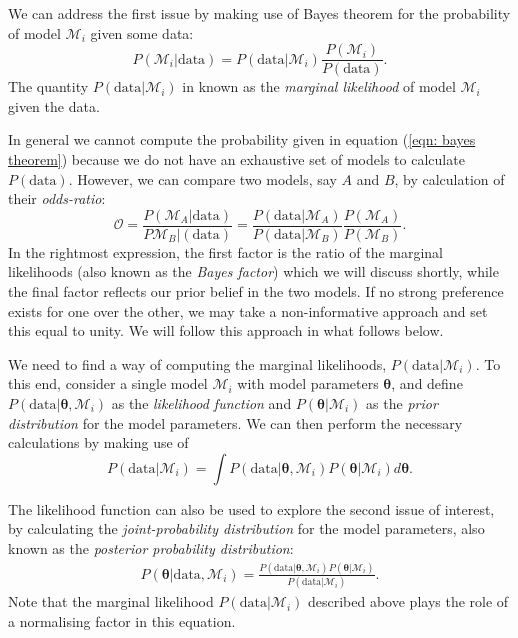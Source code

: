 \documentclass[../full_thesis/full_thesis.tex]{subfiles}
\newcommand{\M}{\mathcal{M}}
\newcommand{\data}{\textrm{data}}
\newcommand{\params}{\boldsymbol{\theta}}
\begin{document}
We can address the first issue by making use of Bayes theorem for the
probability of model $\M_{i}$ given some data:
\begin{equation}
    P(\M_{i} | \data) = P(\data | \M_{i}) \frac{P(\M_{i})}{P(\data)}.
\label{eqn: bayes theorem}
\end{equation}
The quantity $P(\data | \M_{i})$ in known as the \emph{marginal likelihood} of
model $\M_i$ given the data.

In general we cannot compute the probability given in equation (\ref{eqn: bayes
theorem})  because we do not have an exhaustive set of models to calculate
$P(\data)$.  However, we can compare two models, say $A$ and $B$, by
calculation of their \emph{odds-ratio}:
\begin{equation}
\mathcal{O} = \frac{P(\M_{A}|\data)}{P\M_{B}|(\data)}=
            \frac{P(\data|\M_{A})}{P(\data|\M_{B})}
            \frac{P(\M_{A})}{P(\M_{B})}.
\label{eqn: odds-ratio}
\end{equation}
In the rightmost expression, the first factor is the ratio of the marginal
likelihoods (also known as the \emph{Bayes factor}) which we will discuss
shortly, while the final factor reflects our prior belief in the two models. If
no strong preference exists for one over the other, we may take a
non-informative approach and set this equal to unity.  We will follow this
approach in what follows below.

We need to find a way of computing the marginal likelihoods, $P(\data |
\M_{i})$.  To this end, consider a single model  $\M_{i}$ with model parameters
$\params$, and define $P(\data| \params, \M_{i})$ as the \emph{likelihood
function} and $P(\params | \M_{i})$ as the \emph{prior distribution} for the
model parameters.   We can then perform the necessary calculations by making
use of
\begin{equation}
    P(\data|\M_{i}) = \int
                      P(\data| \params, \M_{i})P(\params | \M_{i})
                      d\params.
\label{eqn: marginal likelihood}
\end{equation}

The likelihood function can also be used to explore the second issue of
interest, by calculating the \emph{joint-probability distribution} for the
model parameters, also known as the \emph{posterior probability distribution}:
\begin{align}
P(\params| \data, \M_{i}) =
\frac{P(\data| \params, \M_{i})P(\params | \M_{i})}
{P(\data| \M_{i})}.
\end{align}
Note that the marginal likelihood $P(\data| \M_{i})$ described above plays the
role of a normalising factor in this equation.
\end{document}
